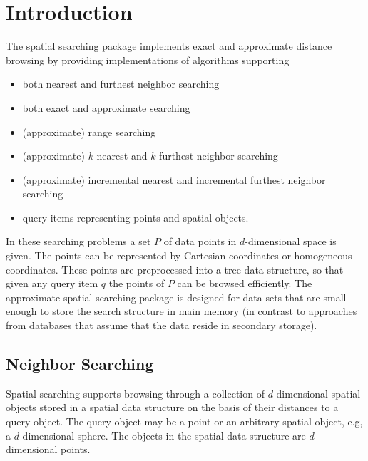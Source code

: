 

\section{Introduction}

The spatial searching package implements exact and approximate
distance browsing by providing implementations of algorithms
supporting

\begin{itemize} 

\item
both nearest and furthest neighbor searching

\item
both exact and approximate searching

\item
(approximate) range searching

\item 
(approximate) $k$-nearest and $k$-furthest neighbor searching

\item 
(approximate) incremental nearest and incremental furthest neighbor searching

\item
query items representing points and spatial objects.

\end{itemize}

In these searching problems a set $P$ of data points in
$d$-dimensional space is given.  The points can be represented by
Cartesian coordinates or homogeneous coordinates.  These points are
preprocessed into a tree data structure, so that given any
query item $q$ the points of $P$ can be browsed efficiently.  The
approximate spatial searching package is designed for data sets that
are small enough to store the search structure in main memory (in
contrast to approaches from databases that assume that the data reside
in secondary storage).

\subsection{Neighbor Searching}

Spatial searching supports browsing through a collection of
$d$-dimensional spatial objects stored in a spatial data structure on
the basis of their distances to a query object. The query object may
be a point or an arbitrary spatial object, e.g, a $d$-dimensional
sphere. The objects in the spatial data structure are $d$-dimensional
points.

